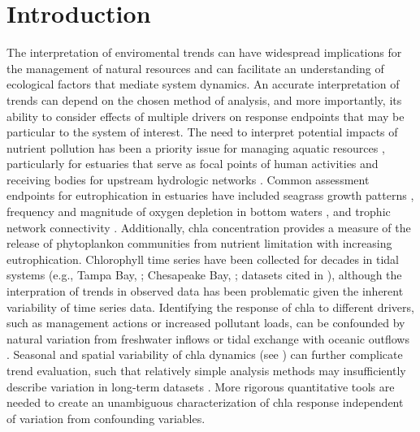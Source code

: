 \documentclass{svjour3}\usepackage[]{graphicx}\usepackage[]{color}
\begin{document}
\linenumbers

\acresetall
\section{Introduction} \label{intro}

The interpretation of enviromental trends can have widespread implications for the management of natural resources and can facilitate an understanding of ecological factors that mediate system dynamics.  An accurate interpretation of trends can depend on the chosen method of analysis, and more importantly, its ability to consider effects of multiple drivers on response endpoints that may be particular to the system of interest.  The need to interpret potential impacts of nutrient pollution has been a priority issue for managing aquatic resources \cite{Nixon95}, particularly for estuaries that serve as focal points of human activities and receiving bodies for upstream hydrologic networks \cite{Paerl14}.  Common assessment endpoints for eutrophication in estuaries have included seagrass growth patterns \cite{Steward07}, frequency and magnitude of oxygen depletion in bottom waters \cite{Paerl06}, and trophic network connectivity \cite{Powers05}.  Additionally, \ac{chla} concentration provides a measure of the release of phytoplankon communities from nutrient limitation with increasing eutrophication.  Chlorophyll time series have been collected for decades in tidal systems (e.g., Tampa Bay, \cite{TBEP11}; Chesapeake Bay, \cite{Harding94}; datasets cited in \cite{Monbet92,Cloern10}), although the interpration of trends in observed data has been problematic given the inherent variability of time series data. Identifying the response of \ac{chla} to different drivers, such as management actions or increased pollutant loads, can be confounded by natural variation from freshwater inflows \cite{Borsuk04b} or tidal exchange with oceanic outflows \cite{Monbet92}.  Seasonal and spatial variability of \ac{chla} dynamics (see \cite{Cloern96}) can further complicate trend evaluation, such that relatively simple analysis methods may insufficiently describe variation in long-term datasets \cite{Hirsch14b}.  More rigorous quantitative tools are needed to create an unambiguous characterization of \ac{chla} response independent of variation from confounding variables.
\end{document}
